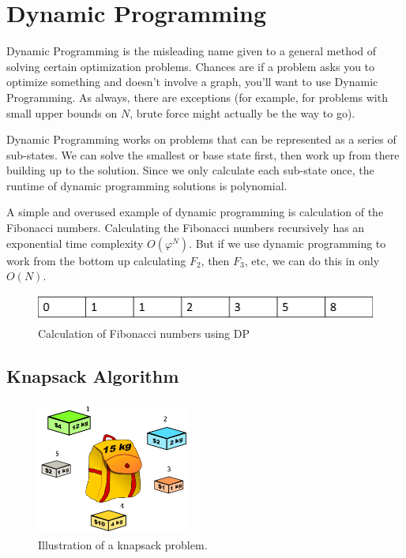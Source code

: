 \chapter{Dynamic Programming}

Dynamic Programming is the misleading name given to a general method of solving certain optimization problems.  Chances are if a problem asks you to optimize something and doesn't involve a graph, you'll want to use Dynamic Programming.  As always, there are exceptions  (for example, for problems with small upper bounds on $N$, brute force might actually be the way to go).

Dynamic Programming works on problems that can be represented as a series of sub-states.  We can solve the smallest or base state first, then work up from there building up to the solution.  Since we only calculate each sub-state once, the runtime of dynamic programming solutions is polynomial.

A simple and overused example of dynamic programming is calculation of the Fibonacci numbers.  Calculating the Fibonacci numbers recursively has an exponential time complexity $O(\varphi^N)$.  But if we use dynamic programming to work from the bottom up calculating $F_2$, then $F_3$, etc, we can do this in only $O(N)$.

\begin{figure}[h]
\begin{center}
\includegraphics[width=6in]{images/fib-dp.png}
\end{center}
\caption{Calculation of Fibonacci numbers using DP}
\end{figure}

\section{Knapsack Algorithm}

\begin{figure}[ht]
\begin{center}
\includegraphics[width=2in]{images/knapsack.png}
\end{center}
\caption{Illustration of a knapsack problem.}
\label{fig:ihatelarry}
\end{figure}

